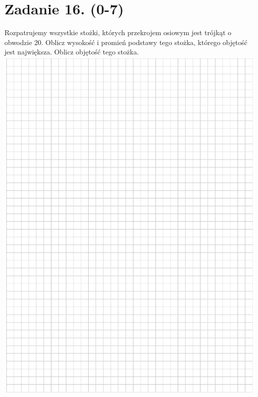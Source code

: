 \documentclass[10pt]{article}
\begin{document}
\section*{Zadanie 16. (0-7)}
Rozpatrujemy wszystkie stożki, których przekrojem osiowym jest trójkąt o obwodzie 20. Oblicz wysokość i promień podstawy tego stożka, którego objętość jest największa. Oblicz objętość tego stożka.\\
\includegraphics[max width=\textwidth, center]{2024_11_21_838c0cfd77f195c20440g-20}\\
\end{document}
